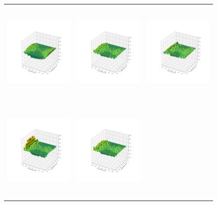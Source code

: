 \begin{figure}[h!t]
      \centering
   \begin{tabular}[width=20cm, height=20cm]{ccc}
             \centering
   \includegraphics[height=5cm]{_pics/IF_plots/Variance_t_copula_MLE.pdf} &
   \includegraphics[height=5cm]{_pics/IF_plots/ERM10_t_copula_MLE.pdf}&
   \includegraphics[height=5cm]{_pics/IF_plots/VaR5_t_copula_MLE.pdf} \\
   \includegraphics[height=5cm]{_pics/IF_plots/VaR1_t_copula_MLE.pdf} &
   \includegraphics[height=5cm]{_pics/IF_plots/ES5_t_copula_MLE.pdf} &

\end{tabular}
\end{figure}
